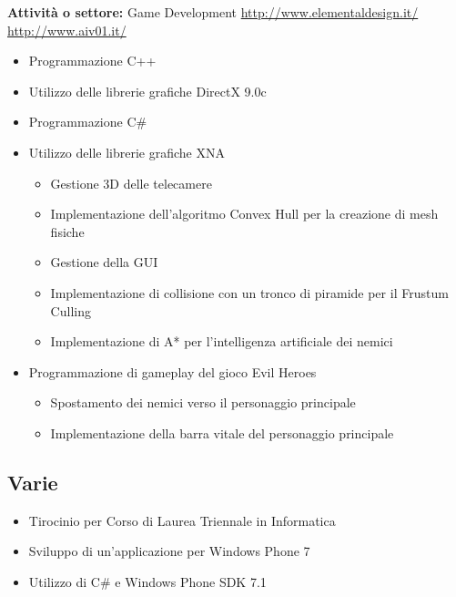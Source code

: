 \documentclass[11pt,a4paper,sans]{moderncv} %
\begin{document}
{
	\textbf{Attivit\`{a} o settore:} Game Development
	\newline{}
	\url{http://www.elementaldesign.it/}
	\newline{}
	\url{http://www.aiv01.it/} 
	\begin{itemize}
		\item Programmazione C++
		\item Utilizzo delle librerie grafiche DirectX 9.0c
		\item Programmazione C\#
		\item Utilizzo delle librerie grafiche XNA
		\begin{itemize}
			\item Gestione 3D delle telecamere
			\item Implementazione dell'algoritmo Convex Hull per la creazione di mesh fisiche
			\item Gestione della GUI
			\item Implementazione di collisione con un tronco di piramide per il Frustum Culling
			\item Implementazione di A* per l'intelligenza artificiale dei nemici
		\end{itemize}
		\item Programmazione di gameplay del gioco Evil Heroes
		\begin{itemize}
			\item Spostamento dei nemici verso il personaggio principale
			\item Implementazione della barra vitale del personaggio principale
		\end{itemize}
	\end{itemize}
}

\subsection{Varie}

{
	\begin{itemize}
		\item Tirocinio per Corso di Laurea Triennale in Informatica
		\item Sviluppo di un'applicazione per Windows Phone 7
		\item Utilizzo di C\# e Windows Phone SDK 7.1
	\end{itemize}
}
\end{document}

